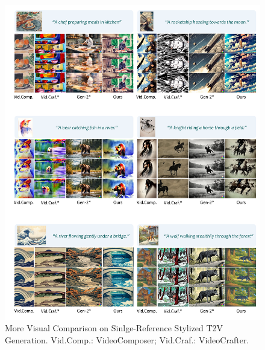 \begin{figure}[t]
    \centering
    \includegraphics[width=0.9\linewidth]{figures/supp/result_comp_single_ref_1.pdf}
    \caption{More Visual Comparison on Sinlge-Reference Stylized T2V Generation. Vid.Comp.: VideoComposer; Vid.Craf.: VideoCrafter.} 
    \label{fig:supp_more_result_comp_single}
\end{figure}

